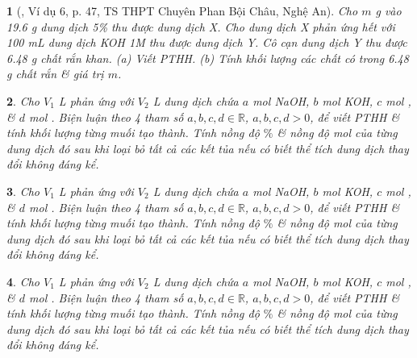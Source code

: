 \documentclass{article}
\newtheorem{baitoan}{}
\begin{document}
\begin{baitoan}[\cite{Truong_Long_Huong_bdhsg_Hoa_Hoc_9}, Ví dụ 6, p. 47, TS THPT Chuyên Phan Bội Châu, Nghệ An]
	Cho $m$ {\rm g } vào {\rm19.6 g} dung dịch {\rm{} 5\%} thu được dung dịch X. Cho dung dịch X phản ứng hết với {\rm100 mL} dung dịch {\rm KOH 1M} thu được dung dịch Y. Cô cạn dung dịch Y thu được {\rm6.48 g} chất rắn khan. (a) Viết {\rm PTHH}. (b) Tính khối lượng các chất có trong {\rm6.48 g} chất rắn \& giá trị $m$.
\end{baitoan}

\begin{baitoan}
	Cho $V_1$ {\rm L } phản ứng với $V_2$ {\rm L} dung dịch chứa $a$ mol {\rm NaOH}, $b$ mol {\rm KOH}, $c$ mol {\rm{}}, \& $d$ mol {\rm{}}. Biện luận theo 4 tham số $a,b,c,d\in\mathbb{R}$, $a,b,c,d > 0$, để viết {\rm PTHH} \& tính khối lượng từng muối tạo thành. Tính nồng độ $\%$ \& nồng độ mol của từng dung dịch đó sau khi loại bỏ tất cả các kết tủa nếu có biết thể tích dung dịch thay đổi không đáng kể.
\end{baitoan}

\begin{baitoan}
	Cho $V_1$ {\rm L } phản ứng với $V_2$ {\rm L} dung dịch chứa $a$ mol {\rm NaOH}, $b$ mol {\rm KOH}, $c$ mol {\rm{}}, \& $d$ mol {\rm{}}. Biện luận theo 4 tham số $a,b,c,d\in\mathbb{R}$, $a,b,c,d > 0$, để viết {\rm PTHH} \& tính khối lượng từng muối tạo thành. Tính nồng độ $\%$ \& nồng độ mol của từng dung dịch đó sau khi loại bỏ tất cả các kết tủa nếu có biết thể tích dung dịch thay đổi không đáng kể.
\end{baitoan}

\begin{baitoan}
	Cho $V_1$ {\rm L } phản ứng với $V_2$ {\rm L} dung dịch chứa $a$ mol {\rm NaOH}, $b$ mol {\rm KOH}, $c$ mol {\rm{}}, \& $d$ mol {\rm{}}. Biện luận theo 4 tham số $a,b,c,d\in\mathbb{R}$, $a,b,c,d > 0$, để viết {\rm PTHH} \& tính khối lượng từng muối tạo thành. Tính nồng độ $\%$ \& nồng độ mol của từng dung dịch đó sau khi loại bỏ tất cả các kết tủa nếu có biết thể tích dung dịch thay đổi không đáng kể.
\end{baitoan}


\printbibliography[heading=bibintoc]
\end{document}
